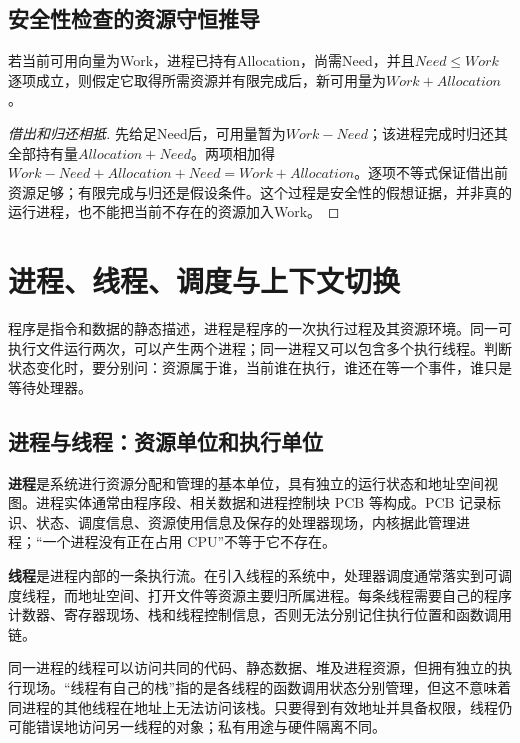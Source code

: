 \subsection{安全性检查的资源守恒推导}\label{OS02-conservation-proof}

\begin{theorem}[假定一个进程完成后的净资源变化]

若当前可用向量为Work，进程已持有Allocation，尚需Need，并且\(Need\le Work\)逐项成立，则假定它取得所需资源并有限完成后，新可用量为\(Work+Allocation\)。

\end{theorem}

\begin{proof}[借出和归还相抵]

先给足Need后，可用量暂为\(Work-Need\)；该进程完成时归还其全部持有量\(Allocation+Need\)。两项相加得\(Work-Need+Allocation+Need=Work+Allocation\)。逐项不等式保证借出前资源足够；有限完成与归还是假设条件。这个过程是安全性的假想证据，并非真的运行进程，也不能把当前不存在的资源加入Work。

\end{proof}

\section{进程、线程、调度与上下文切换}\label{OS02-module-02}

程序是指令和数据的静态描述，进程是程序的一次执行过程及其资源环境。同一可执行文件运行两次，可以产生两个进程；同一进程又可以包含多个执行线程。判断状态变化时，要分别问：资源属于谁，当前谁在执行，谁还在等一个事件，谁只是等待处理器。

\subsection{进程与线程：资源单位和执行单位}\label{OS02-2-1}

\textbf{进程}是系统进行资源分配和管理的基本单位，具有独立的运行状态和地址空间视图。进程实体通常由程序段、相关数据和进程控制块 PCB 等构成。PCB 记录标识、状态、调度信息、资源使用信息及保存的处理器现场，内核据此管理进程；``一个进程没有正在占用 CPU''不等于它不存在。

\textbf{线程}是进程内部的一条执行流。在引入线程的系统中，处理器调度通常落实到可调度线程，而地址空间、打开文件等资源主要归所属进程。每条线程需要自己的程序计数器、寄存器现场、栈和线程控制信息，否则无法分别记住执行位置和函数调用链。

同一进程的线程可以访问共同的代码、静态数据、堆及进程资源，但拥有独立的执行现场。``线程有自己的栈''指的是各线程的函数调用状态分别管理，但这不意味着同进程的其他线程在地址上无法访问该栈。只要得到有效地址并具备权限，线程仍可能错误地访问另一线程的对象；私有用途与硬件隔离不同。

